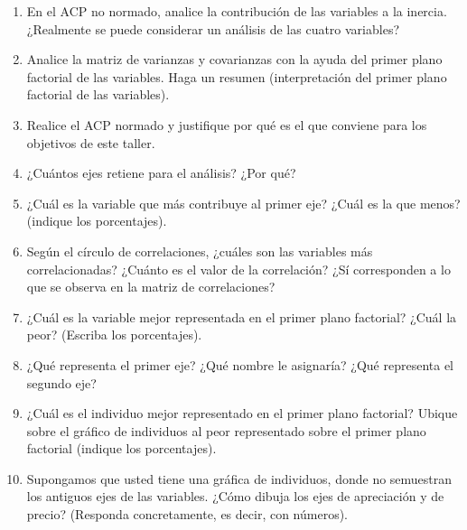 \documentclass[letterpaper, 12pt]{article}
\begin{document}
\begin{enumerate}

        \item En el ACP no normado, analice la contribución de las variables 
        a la inercia. ¿Realmente se puede considerar un análisis de las cuatro 
        variables?
        
        \item Analice la matriz de varianzas y covarianzas con la ayuda del 
        primer plano factorial de las variables. Haga un resumen (interpretación 
        del primer plano factorial de las variables).
        
        \item Realice el ACP normado y justifique por qué es el que conviene 
        para los objetivos de este taller.
        
        \item ¿Cuántos ejes retiene para el análisis? ¿Por qué?
        
        \item ¿Cuál es la variable que más contribuye al primer eje? ¿Cuál 
        es la que menos? (indique los porcentajes).
        
        \item Según el círculo de correlaciones, ¿cuáles son las variables 
        más correlacionadas? ¿Cuánto es el valor de la correlación? ¿Sí 
        corresponden a lo que se observa en la matriz de correlaciones?
        
        \item ¿Cuál es la variable mejor representada en el primer plano 
        factorial? ¿Cuál la peor? (Escriba los porcentajes).
        
        \item ¿Qué representa el primer eje? ¿Qué nombre le asignaría? ¿Qué 
        representa el segundo eje?
        
        \item ¿Cuál es el individuo mejor representado en el primer plano 
        factorial? Ubique sobre el gráfico de individuos al peor representado 
        sobre el primer plano factorial (indique los porcentajes).
        
        \item Supongamos que usted tiene una gráfica de individuos, donde 
        no semuestran los antiguos ejes de las variables. ¿Cómo dibuja los ejes 
        de apreciación y de precio? (Responda concretamente, es decir, con 
        números).
        

\end{enumerate}
\end{document}
